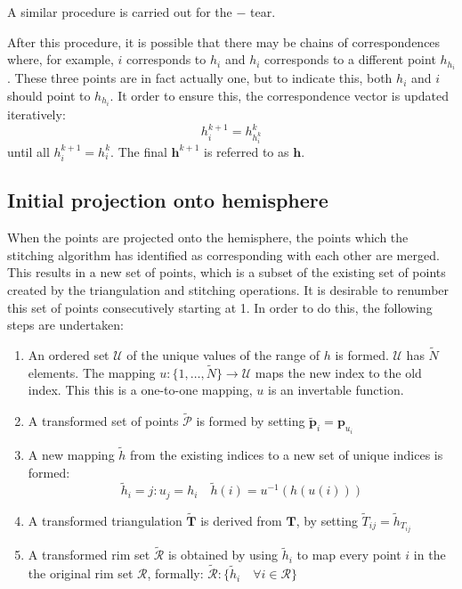 \documentclass{article}
\renewcommand{\vec}[1]{\mathbf{#1}}
\begin{document}
A similar procedure is carried out for the $-$ tear.

After this procedure, it is possible that there may be chains of
correspondences where, for example, $i$ corresponds to $h_i$ and $h_i$
corresponds to a different point $h_{h_i}$. These three points are in
fact actually one, but to indicate this, both $h_i$ and $i$ should
point to $h_{h_i}$. It order to ensure this, the correspondence vector
is updated iteratively:
\begin{displaymath}
  h^{k+1}_i = h^k_{h^k_i}  
\end{displaymath}
until all $h^{k+1}_i = h^k_i$. The final $\vec{h}^{k+1}$ is referred
to as $\vec{h}$.



\subsection{Initial projection onto hemisphere}
\label{fold-sphere:sec:proj-onto-hemisph}

When the points are projected onto the hemisphere, the points which
the stitching algorithm has identified as corresponding with each
other are merged. This results in a new set of points, which is a
subset of the existing set of points created by the triangulation and
stitching operations. It is desirable to renumber this set of points
consecutively starting at 1. In order to do this, the following steps
are undertaken:
\begin{enumerate}
\item An ordered set $\mathcal{U}$ of the unique values of the range
  of $h$ is formed. $\mathcal{U}$ has $\tilde N$ elements. The mapping
  $u: \{1,\dots, \tilde N\} \rightarrow \mathcal{U}$ maps the new
  index to the old index. This this is a one-to-one mapping, $u$ is an
  invertable function.
\item A transformed set of points $\mathcal{\tilde P}$ is formed by
  setting $\tilde{\vec{p}}_i = \vec{p}_{u_i}$
\item A new mapping $\tilde h$ from the existing indices to a
  new set of unique indices is formed:
  \begin{displaymath}
    \tilde h_i = j:u_j = h_i \quad
    \tilde h(i) = u^{-1}(h(u(i)))
  \end{displaymath}
\item A transformed triangulation $\tilde{\mathbf{T}}$ is derived from
  $\mathbf{T}$, by setting $\tilde{T}_{ij} = \tilde h_{T_{ij}}$
\item A transformed rim set $\mathcal{\tilde R}$ is obtained by using
  $\tilde h_i$ to map every point $i$ in the the original rim set
  $\mathcal{R}$, formally: $\mathcal{\tilde R}: \{\tilde h_i
  \quad\forall i \in \mathcal{R}\} $
\end{enumerate}
\end{document}
